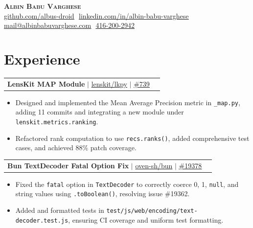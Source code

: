 \documentclass[letterpaper,10pt]{article}
\makeatletter
\newcommand{\resumeItem}[1]{
  \item\small{
    {#1 \vspace{-2pt}}
  }
}
\newcommand{\resumeProjectHeading}[2]{
    \item
    \begin{tabular*}{0.97\textwidth}{l@{\extracolsep{\fill}}r}
      \small#1 & #2 \\
    \end{tabular*}\vspace{-7pt}
}
\newcommand{\resumeItemListStart}{\begin{itemize}}
\newcommand{\resumeItemListEnd}{\end{itemize}\vspace{-5pt}}
\makeatother
\begin{document}
\begin{flushright}
  \color{gray}
  \item
\end{flushright}

\vspace{-5pt}

\begin{center}
    \textbf{\Huge \scshape Albin Babu Varghese} \\ \vspace{8pt}
    \small 
    \href{https://github.com/albus-droid}{\underline{github.com/albus-droid}} $  $
    \href{https://www.linkedin.com/in/albin-babu-varghese/}{\underline{linkedin.com/in/albin-babu-varghese}} $  $
    \href{mailto:mail@albinbabuvarghese.com}{\underline{mail@albinbabuvarghese.com}} $  $
    \href{tel:+14162002942}{\underline{416-200-2942}}
\end{center}

\section{Experience}
        \resumeProjectHeading
        {\textbf{LensKit MAP Module} $|$ \footnotesize\href{https://github.com/lenskit/lkpy}{lenskit/lkpy} $|$ \href{https://github.com/lenskit/lkpy/pull/739}{\underline{\#739}}}{}
        \resumeItemListStart
            \resumeItem{Designed and implemented the Mean Average Precision metric in \texttt{\_map.py}, adding 11 commits and integrating a new module under \texttt{lenskit.metrics.ranking}.}
            \resumeItem{Refactored rank computation to use \texttt{recs.ranks()}, added comprehensive test cases, and achieved 88\% patch coverage.}
        \resumeItemListEnd
        
       \resumeProjectHeading
        {\textbf{Bun TextDecoder Fatal Option Fix} $|$ \footnotesize\href{https://github.com/oven-sh/bun}{oven-sh/bun} $|$ \href{https://github.com/oven-sh/bun/pull/19378}{\underline{\#19378}}}{}
        \resumeItemListStart
            \resumeItem{Fixed the \texttt{fatal} option in \texttt{TextDecoder} to correctly coerce 0, 1, \texttt{null}, and string values using \texttt{.toBoolean()}, resolving issue \#19362.}
            \resumeItem{Added and formatted tests in \texttt{test/js/web/encoding/text-decoder.test.js}, ensuring CI coverage and uniform test formatting.}
        \resumeItemListEnd
\end{document}
